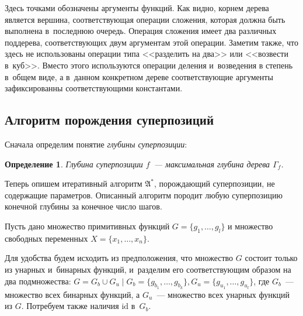 \documentclass[12pt,a4paper]{amsart}
\newtheorem{defin}{Определение}
\begin{document}
Здесь точками обозначены аргументы функций. Как видно, корнем дерева является
вершина, соответствующая операции сложения, которая должна быть выполнена
в~последнюю очередь. Операция сложения имеет два различных поддерева,
соответствующих двум аргументам этой операции. Заметим также, что здесь не
использованы операции типа <<разделить на два>> или <<возвести в~куб>>.
Вместо этого используются операции деления и~возведения в степень в~общем
виде, а в~данном конкретном дереве соответствующие аргументы зафиксированны
соответствующими константами.

\subsection{Алгоритм порождения суперпозиций}

Сначала определим понятие \emph{глубины суперпозиции}:

\begin{defin}
  Глубина суперпозиции $f$~--- максимальная глубина дерева $\Gamma_f$.
\end{defin}

Теперь опишем итеративный алгоритм $\mathfrak{A^*}$, порождающий суперпозиции,
не содержащие параметров. Описанный алгоритм породит любую суперпозицию
конечной глубины за конечное число шагов.

Пусть дано множество примитивных функций $G = \{ g_1, \dots, g_l \}$ и
множество свободных переменных $X = \{ x_1, \dots, x_n \}$.

Для удобства будем исходить из предположения, что множество $G$ состоит
только из унарных и~бинарных функций, и~разделим его соответствующим образом
на два подмножества:
$G = G_b \cup G_u \mid G_b = \{ g_{b_1}, \dots, g_{b_k} \}, G_u = \{ g_{u_1}, \dots, g_{u_l} \}$,
где $G_b$~--- множество всех бинарных функций, а $G_u$~--- множество всех
унарных функций из $G$. Потребуем также наличия $\text{id}$ в~$G_b$.
\end{document}

